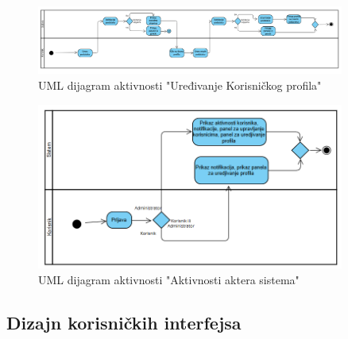 \begin{figure}[H]
    \centering
    \includegraphics[width=0.9\textwidth]{Slike/fz3.2.png}
    \caption{UML dijagram aktivnosti "Uređivanje Korisničkog profila"}
    \label{fig:fz3.2}
\end{figure}

\begin{figure}[H]
    \centering
    \includegraphics[width=0.9\textwidth]{Slike/fz3.12.png}
    \caption{UML dijagram aktivnosti "Aktivnosti aktera sistema"}
    \label{fig:fz3.12}
\end{figure}

\sloppy

\subsection{Dizajn korisničkih interfejsa}

